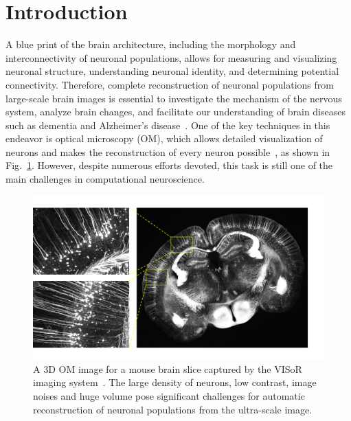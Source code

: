 \section{Introduction}
\label{sec:introduction}

A blue print of the brain architecture, including the morphology and interconnectivity of neuronal populations, allows for measuring and visualizing neuronal structure, understanding neuronal identity, and determining potential connectivity.
Therefore, complete reconstruction of neuronal populations from large-scale brain images is essential to investigate the mechanism of the nervous system, analyze brain changes, and facilitate our understanding of brain diseases such as dementia and Alzheimer's disease~\cite{Petrella2003, Giorgio2013}.
One of the key techniques in this endeavor is optical microscopy (OM), which allows detailed visualization of neurons and makes the reconstruction of every neuron possible~\cite{Senft2011}, as shown in Fig.~\ref{fig:brain}.
However, despite numerous efforts devoted, this task is still one of the main challenges in computational neuroscience.

\begin{figure}[t]
	\centering
	\includegraphics[width=1\columnwidth]{./Illustrations/brain2.pdf}
	\caption{A 3D OM image for a mouse brain slice captured by the VISoR imaging system~\cite{Wang2019}. The large density of neurons, low contrast, image noises and huge volume pose significant challenges for automatic reconstruction of neuronal populations from the ultra-scale image.}	
	\label{fig:brain}
\end{figure}


